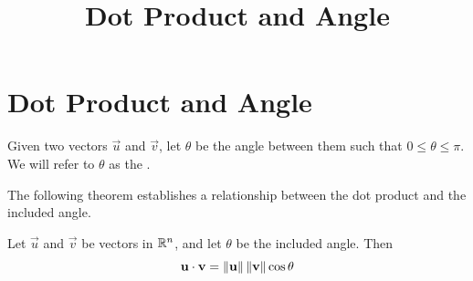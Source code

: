\documentclass{ximera}
\title{Dot Product and Angle} \license{CC BY-NC-SA 4.0}
\begin{document}
\begin{abstract}

\end{abstract}
\maketitle

\section*{Dot Product and Angle}

Given two vectors $\vec{u}$ and $\vec{v}$, let $\theta$ be the angle between them such that $0\leq\theta\leq \pi$.  We will refer to $\theta$ as the .

\begin{center}
\end{center}

The following theorem establishes a relationship between the dot product and the included angle.

  \begin{theorem}\label{th:dotproductcosine} Let $\vec{u}$ and $\vec{v}$ be vectors in $\mathbb{R}^n$, and let $\theta$ be the included angle.  Then
  \begin{equation*} \label{matlintrans}
 \mathbf{u}\cdot\mathbf{v}=\left\lVert\mathbf{u}\right\rVert\left\lVert\mathbf{v}\right\rVert\cos \theta
\end{equation*}
\end{theorem}
\end{document}
